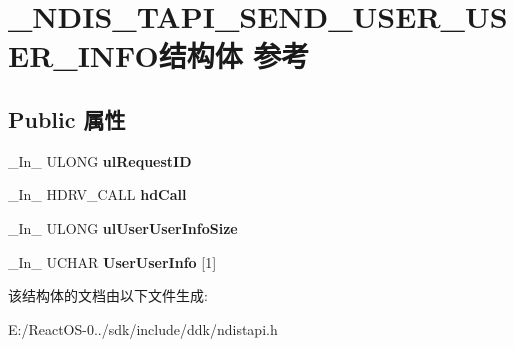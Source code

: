\hypertarget{struct___n_d_i_s___t_a_p_i___s_e_n_d___u_s_e_r___u_s_e_r___i_n_f_o}{}\section{\+\_\+\+N\+D\+I\+S\+\_\+\+T\+A\+P\+I\+\_\+\+S\+E\+N\+D\+\_\+\+U\+S\+E\+R\+\_\+\+U\+S\+E\+R\+\_\+\+I\+N\+F\+O结构体 参考}
\label{struct___n_d_i_s___t_a_p_i___s_e_n_d___u_s_e_r___u_s_e_r___i_n_f_o}
\subsection*{Public 属性}
\begin{DoxyCompactItemize}
\item 
\mbox{\label{struct___n_d_i_s___t_a_p_i___s_e_n_d___u_s_e_r___u_s_e_r___i_n_f_o_ad5a555ea8c35f34bb51e276250363d02}} 
\+\_\+\+In\+\_\+ U\+L\+O\+NG {\bfseries ul\+Request\+ID}
\item 
\mbox{\label{struct___n_d_i_s___t_a_p_i___s_e_n_d___u_s_e_r___u_s_e_r___i_n_f_o_a064c40e3c4dad834b670c198e2f7a8ae}} 
\+\_\+\+In\+\_\+ H\+D\+R\+V\+\_\+\+C\+A\+LL {\bfseries hd\+Call}
\item 
\mbox{\label{struct___n_d_i_s___t_a_p_i___s_e_n_d___u_s_e_r___u_s_e_r___i_n_f_o_a9558984101a8435937e3bb02a085389c}} 
\+\_\+\+In\+\_\+ U\+L\+O\+NG {\bfseries ul\+User\+User\+Info\+Size}
\item 
\mbox{\label{struct___n_d_i_s___t_a_p_i___s_e_n_d___u_s_e_r___u_s_e_r___i_n_f_o_ac68cf9843b3e9cbed1ed1fe1e9e3c90e}} 
\+\_\+\+In\+\_\+ U\+C\+H\+AR {\bfseries User\+User\+Info} \mbox{[}1\mbox{]}
\end{DoxyCompactItemize}


该结构体的文档由以下文件生成\+:\begin{DoxyCompactItemize}
\item 
E\+:/\+React\+O\+S-\/0../sdk/include/ddk/ndistapi.\+h\end{DoxyCompactItemize}
